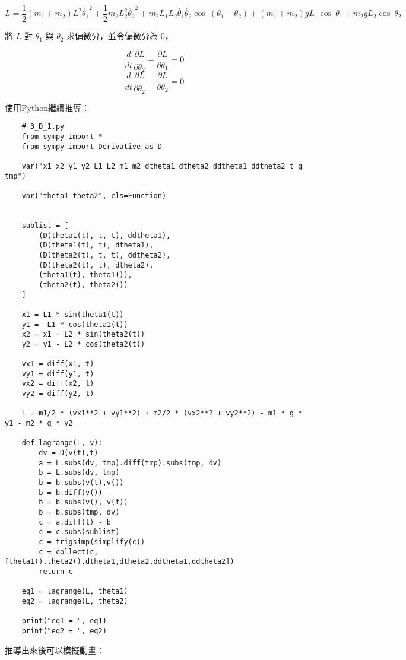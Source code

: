 \documentclass[UTF8,a4paper,12pt]{article}
\begin{document}
$$L = \frac{1}{2}(m_1+m_2)L_1^2\dot{\theta_1}^2 + \frac{1}{2}m_2L_2^2\dot{\theta_2}^2
+ m_2L_1L_2\dot{\theta_1}\dot{\theta_2}\cos\ (\theta_1 - \theta_2)
+ (m_1+m_2)gL_1\cos\ \theta_1 + m_2gL_2\cos\ \theta_2
$$

將 $L$ 對 $\theta_1$ 與 $\theta_2$ 求偏微分，並令偏微分為 $0$，

$$\frac{d}{dt}\frac{\partial L}{\partial \dot{\theta_2}} - \frac{\partial L}{\partial \theta_1} = 0$$
$$\frac{d}{dt}\frac{\partial L}{\partial \dot{\theta_2}} - \frac{\partial L}{\partial \theta_2} = 0$$

使用Python繼續推導：

\begin{lstlisting}
    # 3_D_1.py
    from sympy import *
    from sympy import Derivative as D
    
    var("x1 x2 y1 y2 L1 L2 m1 m2 dtheta1 dtheta2 ddtheta1 ddtheta2 t g tmp")
    
    var("theta1 theta2", cls=Function)
    
    
    sublist = [
        (D(theta1(t), t, t), ddtheta1),
        (D(theta1(t), t), dtheta1),
        (D(theta2(t), t, t), ddtheta2),
        (D(theta2(t), t), dtheta2),
        (theta1(t), theta1()),
        (theta2(t), theta2())
    ]
    
    x1 = L1 * sin(theta1(t))
    y1 = -L1 * cos(theta1(t))
    x2 = x1 + L2 * sin(theta2(t))
    y2 = y1 - L2 * cos(theta2(t))
    
    vx1 = diff(x1, t)
    vy1 = diff(y1, t)
    vx2 = diff(x2, t)
    vy2 = diff(y2, t)
    
    L = m1/2 * (vx1**2 + vy1**2) + m2/2 * (vx2**2 + vy2**2) - m1 * g * y1 - m2 * g * y2
    
    def lagrange(L, v):
        dv = D(v(t),t)
        a = L.subs(dv, tmp).diff(tmp).subs(tmp, dv)
        b = L.subs(dv, tmp)
        b = b.subs(v(t),v())
        b = b.diff(v())
        b = b.subs(v(), v(t))
        b = b.subs(tmp, dv)
        c = a.diff(t) - b
        c = c.subs(sublist)
        c = trigsimp(simplify(c))
        c = collect(c, [theta1(),theta2(),dtheta1,dtheta2,ddtheta1,ddtheta2])
        return c
    
    eq1 = lagrange(L, theta1)
    eq2 = lagrange(L, theta2)
    
    print("eq1 = ", eq1)
    print("eq2 = ", eq2)
\end{lstlisting}

推導出來後可以模擬動畫：
\end{document}
